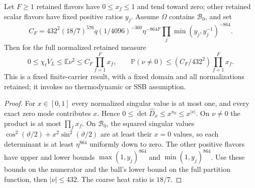 \documentclass[12pt,a4paper]{article}
\begin{document}
\begin{corollary}
\label{p10:cor:v2189-finite-chiral-topological-suppression}
Let $F\ge1$ retained flavors have $0\le x_f\le1$ and tend toward zero;
other retained scalar flavors have fixed positive ratios $y_j$.
Assume $\Omega$ contains $\mathcal B_0$, and set
\[
 C_F=432^2(18/7)^{576}q(1/4096)^{-360}\eta^{-864F}
          \prod_j\min(y_j,y_j^{-1})^{-864}.
\]
Then for the full normalized retained measure
\[
 0\le\chi_tV_L\le\mathbb E\nu^2
 \le C_F\prod_{f=1}^F x_f,
 \qquad
 \mathbb P(\nu\ne0)\le(C_F/432^2)\prod_{f=1}^F x_f.
\]
This is a fixed finite-carrier result, with a fixed domain and all
normalizations retained; it invokes no thermodynamic or SSB assumption.
\end{corollary}
\begin{proof}
For $x\in[0,1]$ every normalized singular value is at most one, and
every exact zero mode contributes $x$. Hence
$0\le\det\widehat D_x\le x^{n_0}\le x^{|\nu|}$.
On $\nu\ne0$ the product is at most $\prod_fx_f$.
On $\mathcal B_0$, the squared singular values
$\cos^2(\vartheta/2)+x^2\sin^2(\vartheta/2)$ are at least their
$x=0$ values, so each determinant is at least $\eta^{864}$ uniformly
down to zero. The other positive flavors have upper and lower bounds
$\max(1,y_j)^{864}$ and $\min(1,y_j)^{864}$.
Use these bounds on the numerator and the ball's lower bound on the full
partition function, then $|\nu|\le432$. The coarse heat ratio is $18/7$.
\end{proof}
\end{document}
